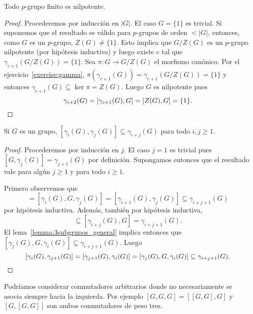 \begin{proposition}
	\label{proposition:pgrupo_nilpotente}
	Todo $p$-grupo finito es nilpotente.
\end{proposition}

\begin{proof}
	Procederemos por inducción en $|G|$. El caso $G=\{1\}$ es trivial. Si suponemos
	que el resultado es válido para $p$-grupos de orden $<|G|$, entonces, como
	$G$ es un $p$-grupo, $Z(G)\ne\{1\}$. Esto implica que $G/Z(G)$ es un $p$-grupo
	nilpotente (por hipótesis inductiva) y luego existe $c$ tal que
	$\gamma_{c+1}(G/Z(G))=\{1\}$. Sea $\pi\colon G\to G/Z(G)$ el morfismo canónico.
	Por el ejercicio~\ref{exercise:gamma},
	$\pi(\gamma_{c+1}(G))=\gamma_{c+1}(G/Z(G))=\{1\}$ y entonces
	$\gamma_{c+1}(G)\subseteq \ker\pi=Z(G)$. Luego $G$ es nilpotente pues 
	\[
		\gamma_{c+2}(G)=[\gamma_{c+1}(G),G]=[Z(G),G]=\{1\}.\qedhere
	\]
\end{proof}

\begin{theorem}
	\label{theorem:gamma}
	Si $G$ es un grupo, $[\gamma_i(G),\gamma_j(G)]\subseteq
	\gamma_{i+j}(G)$ para todo $i,j\geq1$.	
\end{theorem}

\begin{proof}
	Procederemos por inducción en $j$. El caso $j=1$ es trivial pues
	$[G,\gamma_j(G)]=\gamma_{j+1}(G)$ por definición. Supongamos entonces que
	el resultado vale para algún $j\geq1$ y para todo $i\geq1$. 
	
	Primero observemos que 
	\begin{equation*}
		[G,\gamma_i(G),\gamma_j(G)]=[\gamma_i(G),G,\gamma_j(G)]=[\gamma_{i+1}(G),\gamma_j(G)]\subseteq \gamma_{i+j+1}(G)
	\end{equation*}
	por hipótesis inductiva. Además, también por hipótesis inductiva, 
	\begin{equation*}
	[\gamma_i(G),\gamma_j(G),G]\subseteq [\gamma_{i+j}(G),G]=\gamma_{i+j+1}(G).
	\end{equation*}
	El lema~\ref{lemma:3subgrupos_general} implica entonces que $[\gamma_j(G),G,\gamma_i(G)]\subseteq \gamma_{i+j+1}(G)$. Luego 
	\[
	[\gamma_i(G),\gamma_{j+1}(G)]=[\gamma_{j+1}(G),\gamma_i(G)]=[\gamma_j(G),G,\gamma_i(G)]\subseteq \gamma_{i+j+1}(G).\qedhere
	\]
\end{proof}

Podríamos considerar conmutadores arbitrarios donde no necesariamente se asocia
siempre hacia la izquierda. Por ejemplo $[G,G,G]=[ [G,G],G]$ y $[G,[G,G]]$ son
ambos conmutadores de peso tres. 


